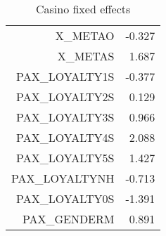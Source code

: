 \documentclass{article}
\begin{document}
\begin{table}[H]
\begin{tabular}{rr}
	X\_METAO	                   &          -0.327          \\        
	X\_METAS	                   &            1.687         \\         
	PAX\_LOYALTY1S    	   &          -0.377          \\        
	PAX\_LOYALTY2S    	   &       0.129              \\    
	PAX\_LOYALTY3S    	   &       0.966              \\    
	PAX\_LOYALTY4S    	   &      2.088               \\   
	PAX\_LOYALTY5S    	   &      1.427               \\   
	PAX\_LOYALTYNH    	   &      -0.713              \\    
	PAX\_LOYALTY0S	           &       -1.391             \\     
	PAX\_GENDERM	           &         0.891            \\    
	\hline 
	\hline 
	\end{tabular}
	\caption{Casino fixed effects}
\end{table}

\begin{table}
	
\end{table}
\end{document}
